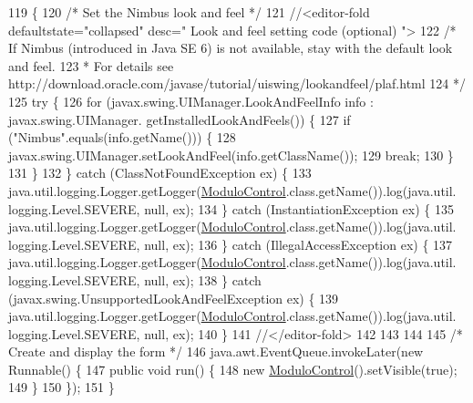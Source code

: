\begin{DoxyCode}
119                                            \{
120         \textcolor{comment}{/* Set the Nimbus look and feel */}
121         \textcolor{comment}{//<editor-fold defaultstate="collapsed" desc=" Look and feel setting code (optional) ">}
122         \textcolor{comment}{/* If Nimbus (introduced in Java SE 6) is not available, stay with the default look and feel.}
123 \textcolor{comment}{         * For details see http://download.oracle.com/javase/tutorial/uiswing/lookandfeel/plaf.html }
124 \textcolor{comment}{         */}
125         \textcolor{keywordflow}{try} \{
126             \textcolor{keywordflow}{for} (javax.swing.UIManager.LookAndFeelInfo info : javax.swing.UIManager.
      getInstalledLookAndFeels()) \{
127                 \textcolor{keywordflow}{if} (\textcolor{stringliteral}{"Nimbus"}.equals(info.getName())) \{
128                     javax.swing.UIManager.setLookAndFeel(info.getClassName());
129                     \textcolor{keywordflow}{break};
130                 \}
131             \}
132         \} \textcolor{keywordflow}{catch} (ClassNotFoundException ex) \{
133             java.util.logging.Logger.getLogger(\mbox{\hyperlink{class_sockets_1_1_modulo_control_a45556bb63f8210bc421e40d207a52ea9}{ModuloControl}}.class.getName()).log(java.util.
      logging.Level.SEVERE, null, ex);
134         \} \textcolor{keywordflow}{catch} (InstantiationException ex) \{
135             java.util.logging.Logger.getLogger(\mbox{\hyperlink{class_sockets_1_1_modulo_control_a45556bb63f8210bc421e40d207a52ea9}{ModuloControl}}.class.getName()).log(java.util.
      logging.Level.SEVERE, null, ex);
136         \} \textcolor{keywordflow}{catch} (IllegalAccessException ex) \{
137             java.util.logging.Logger.getLogger(\mbox{\hyperlink{class_sockets_1_1_modulo_control_a45556bb63f8210bc421e40d207a52ea9}{ModuloControl}}.class.getName()).log(java.util.
      logging.Level.SEVERE, null, ex);
138         \} \textcolor{keywordflow}{catch} (javax.swing.UnsupportedLookAndFeelException ex) \{
139             java.util.logging.Logger.getLogger(\mbox{\hyperlink{class_sockets_1_1_modulo_control_a45556bb63f8210bc421e40d207a52ea9}{ModuloControl}}.class.getName()).log(java.util.
      logging.Level.SEVERE, null, ex);
140         \}
141         \textcolor{comment}{//</editor-fold>}
142         
143         
144         
145         \textcolor{comment}{/* Create and display the form */}
146         java.awt.EventQueue.invokeLater(\textcolor{keyword}{new} Runnable() \{
147             \textcolor{keyword}{public} \textcolor{keywordtype}{void} run() \{
148                 \textcolor{keyword}{new} \mbox{\hyperlink{class_sockets_1_1_modulo_control_a45556bb63f8210bc421e40d207a52ea9}{ModuloControl}}().setVisible(\textcolor{keyword}{true});
149             \}
150         \});
151     \}
\end{DoxyCode}


